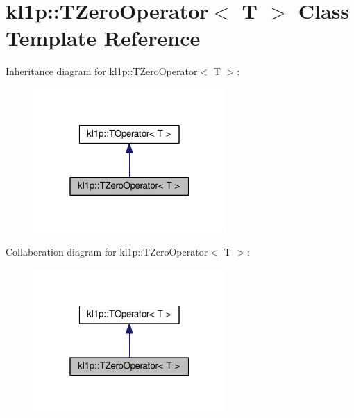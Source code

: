 \hypertarget{classkl1p_1_1TZeroOperator}{}\section{kl1p\+:\+:T\+Zero\+Operator$<$ T $>$ Class Template Reference}
\label{classkl1p_1_1TZeroOperator}


Inheritance diagram for kl1p\+:\+:T\+Zero\+Operator$<$ T $>$\+:
\nopagebreak
\begin{figure}[H]
\begin{center}
\leavevmode
\includegraphics[width=208pt]{classkl1p_1_1TZeroOperator__inherit__graph}
\end{center}
\end{figure}


Collaboration diagram for kl1p\+:\+:T\+Zero\+Operator$<$ T $>$\+:
\nopagebreak
\begin{figure}[H]
\begin{center}
\leavevmode
\includegraphics[width=208pt]{classkl1p_1_1TZeroOperator__coll__graph}
\end{center}
\end{figure}
